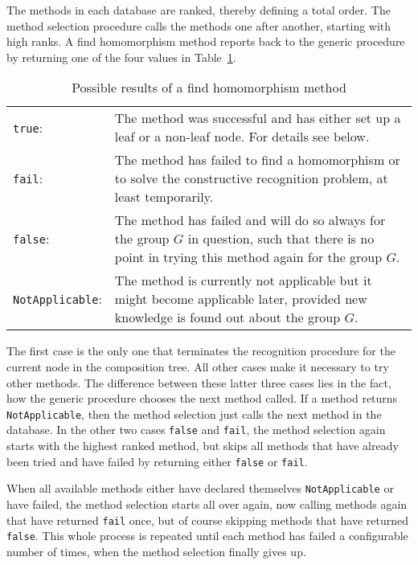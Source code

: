The methods in each database are ranked, thereby defining a total
order. The method selection procedure calls the methods one after another,
starting with high ranks. A find homomorphism method reports back to
the generic procedure by returning one of the four values in
Table~\ref{methselresults}.

\begin{table}[ht]
\caption{Possible results of a find homomorphism method}
\label{methselresults}
\vspace*{3mm}
\begin{tabular}{lp{4.2in}}
\texttt{true}: &
   The method was successful and has either set up a
   leaf or a non-leaf node. For details see below. \\
\texttt{fail}: &
   The method has failed to find a homomorphism or
   to solve the constructive recognition problem, at least temporarily. \\
\texttt{false}: &
   The method has failed and will do so always for
   the group $G$ in question, such that there is no point in trying
   this method again for the group $G$. \\
\texttt{NotApplicable}: &
   The method is currently not applicable
   but it might become applicable later, provided new knowledge is
   found out about the group $G$.
\end{tabular}
\end{table}

The first case is the only one that terminates the recognition procedure
for the current node in the composition tree.
All other cases make it necessary to try other methods. The difference
between these latter three cases lies in the fact, how the generic
procedure chooses the next method called. If a method returns
\texttt{NotApplicable}, then the method selection just calls the next
method in the database. In the other two cases \texttt{false} and 
\texttt{fail}, the method selection again starts with the highest ranked
method, but skips all methods that have already been tried and
have failed by returning either \texttt{false} or \texttt{fail}.

When all available methods either have declared themselves
\texttt{NotApplicable} or have failed, the method selection 
starts all over again, now calling methods again that have returned
\texttt{fail} once, but of course skipping methods that have returned
\texttt{false}. This whole process is repeated until each method has
failed a configurable number of times, when the method selection
finally gives up.

